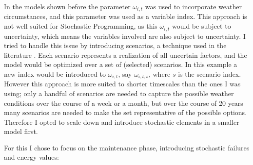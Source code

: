 \documentclass[a4paper,12pt]{article}
\begin{document}
In the models shown before the parameter $\omega_{i,t}$ was used to incorporate weather circumstances, and this parameter was used as a variable index. This approach is not well suited for Stochastic Programming, as this $\omega_{i,t}$ would be subject to uncertainty, which means the variables involved are also subject to uncertainty. I tried to handle this issue by introducing scenarios, a technique used in the literature \cite{besnard2011stochastic,de2012computational}. Each scenario represents a realization of all uncertain factors, and the model would be optimized over a set of (selected) scenarios. In this example a new index would be introduced to $\omega_{i,t}$, say $\omega_{i,t,s}$, where $s$ is the scenario index. However this approach is more suited to shorter timescales than the ones I was using; only a handful of scenarios are needed to capture the possible weather conditions over the course of a week or a month, but over the course of 20 years many scenarios are needed to make the set representative of the possible options. Therefore I opted to scale down and introduce stochastic elements in a smaller model first.

For this I chose to focus on the maintenance phase, introducing stochastic failures and energy values:
\end{document}
